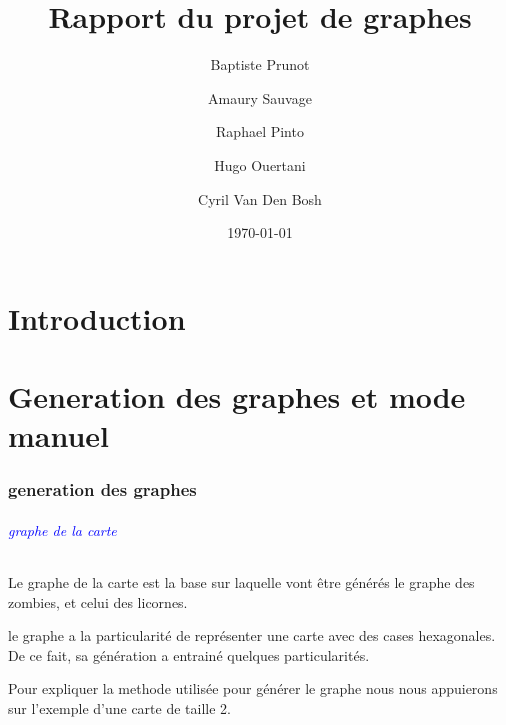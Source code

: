 \documentclass{report}
\title{Rapport du projet de graphes}
\author{Baptiste Prunot
\and Amaury Sauvage
\and Raphael Pinto
\and Hugo Ouertani
\and Cyril Van Den Bosh}
\date{\today}
\begin{document}
	\maketitle

	\part*{Introduction} 
	
	\part{Generation des graphes et mode manuel}
		\section{generation des graphes}
			\paragraph{\textcolor{blue}{graphe de la carte}}
			Le graphe de la carte est la base sur laquelle vont \^etre g\'en\'er\'es le graphe des zombies, et celui des licornes.
			
			le graphe a la particularit\'e de repr\'esenter une carte avec des cases hexagonales. De ce fait, sa g\'en\'eration a entrain\'e quelques particularit\'es.
			
			Pour expliquer la methode utilis\'ee pour g\'en\'erer le graphe nous nous appuierons sur l'exemple d'une carte de taille 2.
			
\end{document}
